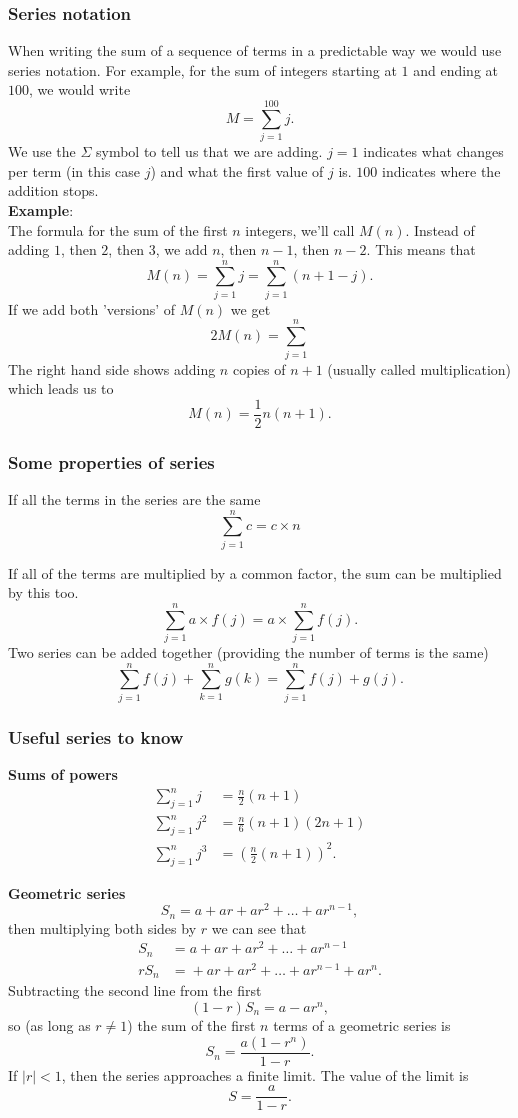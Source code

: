 \documentclass[10pt, a4paper]{article}
\begin{document}
\subsubsection{Series notation}
When writing the sum of a sequence of terms in a predictable way we would use series notation. For example, for the sum of integers starting at $1$ and ending at $100$, we would write
\[
M = \sum_{j = 1}^{100}{j}.
\]
We use the $\Sigma$ symbol to tell us that we are adding. $j = 1$ indicates what changes per term (in this case $j$) and what the first value of $j$ is. $100$ indicates where the addition stops. \\
\textbf{Example}: \\
The formula for the sum of the first $n$ integers, we'll call $M(n)$. Instead of adding $1$, then $2$, then $3$, we add $n$, then $n - 1$, then $n - 2$. This means that
\[
M(n) = \sum_{j = 1}^{n}{j} = \sum_{j = 1}^{n}{(n + 1 - j)}.
\]
If we add both 'versions' of $M(n)$ we get
\[
2M(n) = \sum_{j = 1}^{n}
\]
The right hand side shows adding $n$ copies of $n + 1$ (usually called multiplication) which leads us to
\[
M(n) = \frac{1}{2}n(n + 1).
\]


\subsubsection{Some properties of series}
If all the terms in the series are the same
\[
\sum_{j = 1}^{n}{c} = c \times n
\]

If all of the terms are multiplied by a common factor, the sum can be multiplied by this too.
\[
\sum_{j = 1}^{n}{a \times f(j)} = a \times \sum_{j = 1}^{n}{f(j)}.
\]
Two series can be added together (providing the number of terms is the same)
\[
\sum_{j = 1}^{n}{f(j)} + \sum_{k = 1}^{n}{g(k)} = \sum_{j = 1}^{n}{f(j) + g(j)}.
\]


\subsubsection{Useful series to know}
\textbf{Sums of powers}
\begin{align*}
    \sum_{j = 1}^{n}{j} &= \frac{n}{2}(n + 1) \\
    \sum_{j = 1}^{n}{j ^ 2} &= \frac{n}{6}(n + 1)(2n + 1) \\
    \sum_{j = 1}^{n}{j ^ 3} &= \left(\frac{n}{2}(n + 1)\right) ^ 2.
\end{align*}

\textbf{Geometric series}
\[
S_n = a + ar + ar ^ 2 + \dotsc + ar ^ {n - 1},
\]
then multiplying both sides by $r$ we can see that
\begin{align*}
    S_n &= a + ar + ar ^ 2 + \dotsc + ar ^ {n - 1} \\
    rS_n &= \phantom{ } + ar + ar ^ 2 + \dotsc + ar ^ {n - 1} + ar ^ n.
\end{align*}
Subtracting the second line from the first
\[
(1 - r)S_n = a - ar ^ n,
\]
so (as long as $r \neq 1$) the sum of the first $n$ terms of a geometric series is
\[
S_n = \dfrac{a(1 - r ^ n)}{1 - r}.
\]
If $|r| < 1$, then the series approaches a finite limit. The value of the limit is
\[
S = \dfrac{a}{1 - r}.
\]
\end{document}
